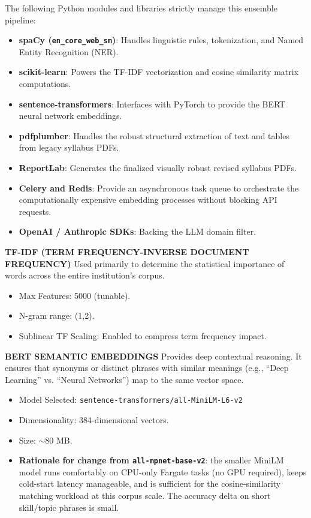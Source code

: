 The following Python modules and libraries strictly manage this ensemble pipeline:
\begin{itemize}
    \item \textbf{spaCy (\texttt{en\_core\_web\_sm})}: Handles linguistic rules, tokenization, and Named Entity Recognition (NER).
    \item \textbf{scikit-learn}: Powers the TF-IDF vectorization and cosine similarity matrix computations.
    \item \textbf{sentence-transformers}: Interfaces with PyTorch to provide the BERT neural network embeddings.
    \item \textbf{pdfplumber}: Handles the robust structural extraction of text and tables from legacy syllabus PDFs.
    \item \textbf{ReportLab}: Generates the finalized visually robust revised syllabus PDFs.
    \item \textbf{Celery and Redis}: Provide an asynchronous task queue to orchestrate the computationally expensive embedding processes without blocking API requests.
    \item \textbf{OpenAI / Anthropic SDKs}: Backing the LLM domain filter.
\end{itemize}

\textbf{TF-IDF (TERM FREQUENCY-INVERSE DOCUMENT FREQUENCY)}
Used primarily to determine the statistical importance of words across the entire institution's corpus.
\begin{itemize}
    \item Max Features: 5000 (tunable).
    \item N-gram range: (1,2).
    \item Sublinear TF Scaling: Enabled to compress term frequency impact.
\end{itemize}

\textbf{BERT SEMANTIC EMBEDDINGS}
Provides deep contextual reasoning. It ensures that synonyms or distinct phrases with similar meanings (e.g., ``Deep Learning'' vs. ``Neural Networks'') map to the same vector space.
\begin{itemize}
    \item Model Selected: \texttt{sentence-transformers/all-MiniLM-L6-v2}
    \item Dimensionality: 384-dimensional vectors.
    \item Size: $\sim$80 MB.
    \item \textbf{Rationale for change from \texttt{all-mpnet-base-v2}}: the smaller MiniLM model runs comfortably on CPU-only Fargate tasks (no GPU required), keeps cold-start latency manageable, and is sufficient for the cosine-similarity matching workload at this corpus scale. The accuracy delta on short skill/topic phrases is small.
\end{itemize}


